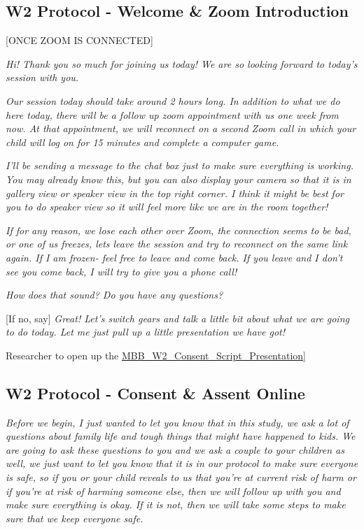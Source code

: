 \documentclass[]{book}
\begin{document}
\hypertarget{w2-protocol---welcome-zoom-introduction}{%
\subsection{W2 Protocol - Welcome \& Zoom Introduction}\label{w2-protocol---welcome-zoom-introduction}}

{[}ONCE ZOOM IS CONNECTED{]}

\emph{Hi! Thank you so much for joining us today! We are so looking forward to today's session with you. }

\emph{Our session today should take around 2 hours long. In addition to what we do here today, there will be a follow up zoom appointment with us one week from now. At that appointment, we will reconnect on a second Zoom call in which your child will log on for 15 minutes and complete a computer game.}

\emph{I'll be sending a message to the chat box just to make sure everything is working. You may already know this, but you can also display your camera so that it is in gallery view or speaker view in the top right corner. I think it might be best for you to do speaker view so it will feel more like we are in the room together!}

\emph{If for any reason, we lose each other over Zoom, the connection seems to be bad, or one of us freezes, lets leave the session and try to reconnect on the same link again. If I am frozen- feel free to leave and come back. If you leave and I don't see you come back, I will try to give you a phone call!}

\emph{How does that sound? Do you have any questions?}

{[}If no, say{]} \emph{Great! Let's switch gears and talk a little bit about what we are going to do today. Let me just pull up a little presentation we have got!}

Researcher to open up the \href{https://app.box.com/file/777489326925}{MBB\_W2\_Consent\_Script\_Presentation}{]}

\hypertarget{w2-protocol---consent-assent-online}{%
\subsection{W2 Protocol - Consent \& Assent Online}\label{w2-protocol---consent-assent-online}}

\emph{Before we begin, I just wanted to let you know that in this study, we ask a lot of questions about family life and tough things that might have happened to kids. We are going to ask these questions to you and we ask a couple to your children as well, we just want to let you know that it is in our protocol to make sure everyone is safe, so if you or your child reveals to us that you're at current risk of harm or if you're at risk of harming someone else, then we will follow up with you and make sure everything is okay. If it is not, then we will take some steps to make sure that we keep everyone safe.}
\end{document}
